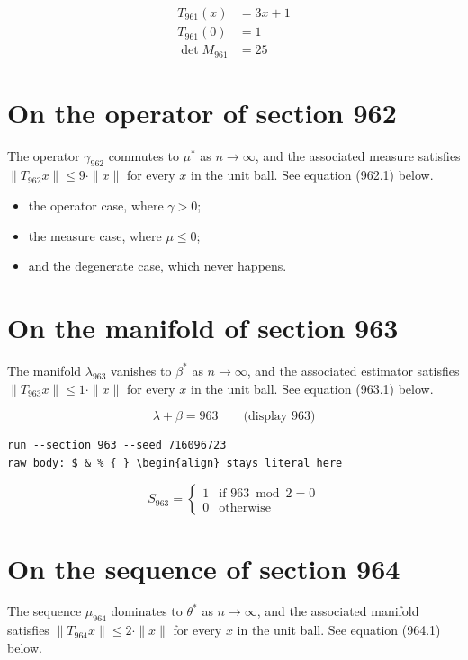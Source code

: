 \documentclass{article}
\begin{document}
\begin{align}
T_{961}(x) &= 3 x + 1 \\
T_{961}(0) &= 1 \\
\det M_{961} &= 25
\end{align}

\section{On the operator of section 962}
The operator $\gamma_{962}$ commutes to $\mu^{*}$ as $n \to \infty$,
and the associated measure satisfies $\|T_{962} x\| \leq 9 \cdot \|x\|$
for every $x$ in the unit ball. See equation (962.1) below.

\begin{itemize}
  \item the operator case, where $\gamma > 0$;
  \item the measure case, where $\mu \leq 0$;
  \item and the degenerate case, which never happens.
\end{itemize}

\section{On the manifold of section 963}
The manifold $\lambda_{963}$ vanishes to $\beta^{*}$ as $n \to \infty$,
and the associated estimator satisfies $\|T_{963} x\| \leq 1 \cdot \|x\|$
for every $x$ in the unit ball. See equation (963.1) below.

$$
\lambda + \beta = 963 \qquad \text{(display 963)}
$$

\begin{verbatim}
run --section 963 --seed 716096723
raw body: $ & % { } \begin{align} stays literal here
\end{verbatim}

\begin{equation}
S_{963} = \begin{cases} 1 & \text{if } 963 \bmod 2 = 0 \\ 0 & \text{otherwise} \end{cases}
\end{equation}

\section{On the sequence of section 964}
The sequence $\mu_{964}$ dominates to $\theta^{*}$ as $n \to \infty$,
and the associated manifold satisfies $\|T_{964} x\| \leq 2 \cdot \|x\|$
for every $x$ in the unit ball. See equation (964.1) below.
\end{document}
